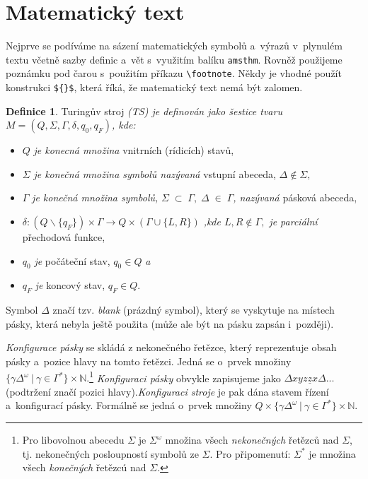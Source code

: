 \documentclass[a4paper,11pt,twocolumn]{article}
\theoremstyle{definition}
\newtheorem{definition}{Definice}
\begin{document}
\section{Matematický text}
Nejprve se podíváme na sázení matematických symbolů
a~výrazů v~plynulém textu včetně sazby definic a~vět s~využitím
balíku \texttt{amsthm}. Rovněž použijeme poznámku pod
čarou s~použitím příkazu \verb|\footnote|. Někdy je vhodné
použít konstrukci \verb|${}$|, která říká, že matematický text
nemá být zalomen.
\begin{definition}
\label{definition_turing}
Turingův stroj \emph{(TS) je definován jako šestice
tvaru} ${M=(Q,\Sigma,\Gamma,\delta,q_0,q_F)}$\emph{, kde:}
\begin{itemize}
\item $Q$ \emph{je konecná množina} vnitrních (rídicích) stavů,
\item $\Sigma$ \emph{je konečná množina symbolů nazývaná} vstupní abeceda, ${\Delta\notin\Sigma,}$
\item $\Gamma$ \emph{je konečná množina symbolů,} ${\Sigma\;\subset\;\Gamma,\;\Delta\;\in\;\Gamma}$\emph{, nazývaná} pásková abeceda,
\item $\delta: (Q\backslash\{q_F\})\times \Gamma \rightarrow Q \times(\Gamma \cup\{L, R\})$ \emph{,kde $L, R\notin\Gamma,$ je parciální} přechodová funkce,
\item $q_0$ \emph{je} počáteční stav, ${q_0 \in Q}$ \emph{a}
\item $q_F$ \emph{je} koncový stav, ${q_F \in Q}$.
\end{itemize}
\end{definition}
Symbol $\Delta$ značí tzv. \emph{blank} (prázdný symbol), který se vyskytuje na místech pásky, která nebyla ještě použita (může ale být na pásku zapsán i~později).

\emph{Konfigurace pásky} se skládá z nekonečného řetězce, který reprezentuje obsah pásky a~pozice hlavy na tomto řetězci. Jedná se o~prvek množiny ${\{\gamma\Delta^\omega\:|\:\gamma \in \Gamma^\ast\} \times \mathbb{N}.}$\footnote{Pro libovolnou abecedu $\Sigma$ je ${\Sigma^\omega}$ množina všech \emph{nekonečných} řetězců nad $\Sigma$, tj. nekonečných posloupností symbolů ze $\Sigma$. Pro připomenutí: ${\Sigma^\ast}$ je množina všech \emph{konečných} řetězcú nad $\Sigma$.} 
\emph{Konfiguraci pásky} obvykle zapisujeme jako ${\Delta x y z\underline{z}x\Delta...}$ (podtržení značí pozici hlavy).\emph{Konfiguraci stroje} je pak dána stavem řízení a~konfigurací pásky. Formálně se jedná o~prvek množiny ${Q \times \{\gamma\Delta^\omega\:|\:\gamma \in \Gamma^\ast\} \times \mathbb{N}.}$
\end{document}
